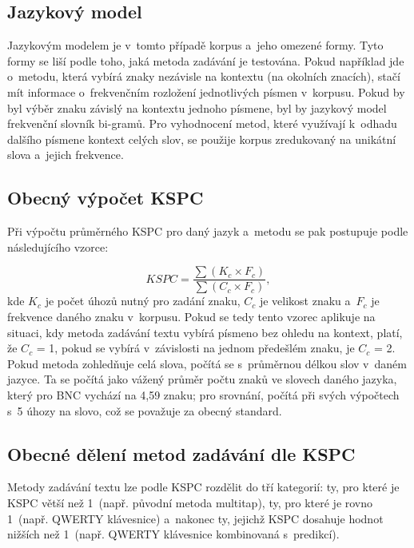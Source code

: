 \documentclass[a4paper,11pt,openany]{book} %
\begin{document}
\subsection{Jazykový model}

Jazykovým modelem je v~tomto případě korpus a~jeho omezené formy. Tyto formy se liší podle toho, jaká metoda zadávání je testována. Pokud například jde o~metodu, která vybírá znaky nezávisle na kontextu (na okolních znacích), stačí mít informace o~frekvenčním rozložení jednotlivých písmen v~korpusu. Pokud by byl výběr znaku závislý na kontextu jednoho písmene, byl by jazykový model frekvenční slovník bi-gramů. Pro vyhodnocení metod, které využívají k~odhadu dalšího písmene kontext celých slov, se použije korpus zredukovaný na unikátní slova a~jejich frekvence.  \parencite[197]{mackenzie2002kspc} %

\subsection{Obecný výpočet KSPC}

Při výpočtu průměrného KSPC pro daný jazyk a~metodu se pak postupuje podle následujícího vzorce:

\[
	KSPC = \frac{\sum{ (K_c \times F_c) }}{\sum{ (C_c \times F_c) }},
\]
kde $K_c$ je počet úhozů nutný pro zadání znaku, $C_c$ je velikost znaku a~$F_c$ je frekvence daného znaku v~korpusu. Pokud se tedy tento vzorec aplikuje na situaci, kdy metoda zadávání textu vybírá písmeno bez ohledu na kontext, platí, že $C_c$ = 1, pokud se vybírá v~závislosti na jednom předešlém znaku, je $C_c$ = 2. Pokud metoda zohledňuje celá slova, počítá se s~průměrnou délkou slov v~daném jazyce. Ta se počítá jako vážený průměr počtu znaků ve slovech daného jazyka, který pro BNC vychází na 4,59 znaku; pro srovnání, \parencite[2]{arif2009analysis} počítá při svých výpočtech s~5 úhozy na slovo, což se považuje za obecný standard. \parencite[3]{tarvainen2010beginner} %

\subsection{Obecné dělení metod zadávání dle KSPC}

Metody zadávání textu lze podle KSPC rozdělit do tří kategorií: ty, pro které je KSPC větší než 1~(např. původní metoda multitap), ty, pro které je rovno 1~(např. QWERTY klávesnice) a~nakonec ty, jejichž KSPC dosahuje hodnot nižších než 1~(např. QWERTY klávesnice kombinovaná s~predikcí). %
\end{document}
